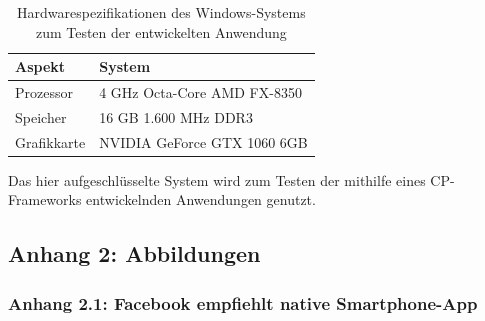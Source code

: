 \documentclass[a4paper]{scrartcl}
\begin{document}
\begin{table}[H]
	\centering
	\caption{Hardwarespezifikationen des Windows-Systems zum Testen der entwickelten Anwendung}
	\begin{center}
		\begin{tabularx}{\linewidth}{| l | X |}
			\hline
			Aspekt & System \\ 
			\hline \hline
			Prozessor & 4 GHz Octa-Core AMD FX-8350 \\
			\hline
			Speicher & 16 GB 1.600 MHz DDR3 \\
			\hline
			Grafikkarte & NVIDIA GeForce GTX 1060 6GB \\
			\hline
		\end{tabularx}
	\end{center}
	\justifying
	\small	
	Das hier aufgeschlüsselte System wird zum Testen der mithilfe eines CP-Frameworks entwickelnden Anwendungen genutzt.
\end{table}

\newpage

\subsection*{Anhang 2: Abbildungen}

\subsubsection*{Anhang 2.1: Facebook empfiehlt native Smartphone-App}
\end{document}
